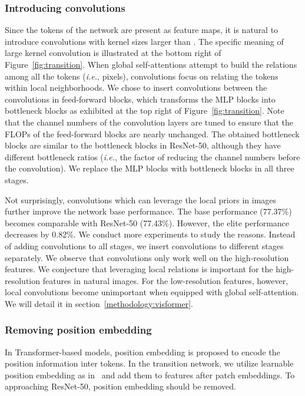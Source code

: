 \documentclass[10pt,twocolumn,letterpaper]{article}
\begin{document}
\subsubsection{Introducing  convolutions}
\label{methodology:transition:conv}

Since the tokens of the network are present as feature maps, it is natural to introduce convolutions with kernel sizes larger than . The specific meaning of large kernel convolution is illustrated at the bottom right of Figure~\ref{fig:transition}. When global self-attentions attempt to build the relations among all the tokens (\textit{i.e.}, pixels), convolutions focus on relating the tokens within local neighborhoods. We chose to insert  convolutions between the  convolutions in feed-forward blocks, which transforms the MLP blocks into bottleneck blocks as exhibited at the top right of Figure~\ref{fig:transition}. Note that the channel numbers of the   convolution layers are tuned to ensure that the FLOPs of the feed-forward blocks are nearly unchanged. The obtained bottleneck blocks are similar to the bottleneck blocks in ResNet-50, although they have different bottleneck ratios (\textit{i.e.}, the factor of reducing the channel numbers before the  convolution). We replace the MLP blocks with bottleneck blocks in all three stages.

Not surprisingly,  convolutions which can leverage the local priors in images further improve the network base performance. The base performance (77.37\%) becomes comparable with ResNet-50 (77.43\%). However, the elite performance decreases by 0.82\%. We conduct more experiments to study the reasons. Instead of adding  convolutions to all stages, we insert  convolutions to different stages separately. We observe that  convolutions only work well on the high-resolution features. We conjecture that leveraging local relations is important for the high-resolution features in natural images. For the low-resolution features, however, local convolutions become unimportant when equipped with global self-attention. We will detail it in section~\ref{methodology:visformer}.

\subsubsection{Removing position embedding}
\label{methodology:transition:embedding}

In Transformer-based models, position embedding is proposed to encode the position information inter tokens. In the transition network, we utilize learnable position embedding as in~\cite{devlin2018bert} and add them to features after patch embeddings. To approaching ResNet-50, position embedding should be removed. 
\end{document}
